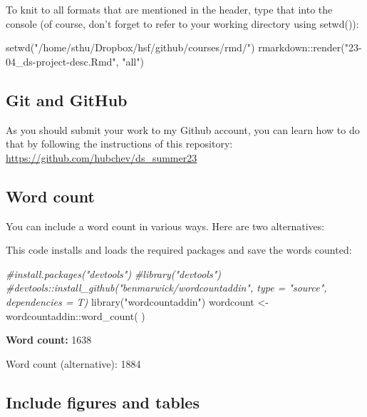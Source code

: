 \documentclass[
  12pt,
]{article}
\newenvironment{Shaded}{\begin{snugshade}}{\end{snugshade}}
\newcommand{\CommentTok}[1]{\textcolor[rgb]{0.56,0.35,0.01}{\textit{#1}}}
\newcommand{\FunctionTok}[1]{\textcolor[rgb]{0.00,0.00,0.00}{#1}}
\newcommand{\NormalTok}[1]{#1}
\newcommand{\OtherTok}[1]{\textcolor[rgb]{0.56,0.35,0.01}{#1}}
\newcommand{\SpecialCharTok}[1]{\textcolor[rgb]{0.00,0.00,0.00}{#1}}
\newcommand{\StringTok}[1]{\textcolor[rgb]{0.31,0.60,0.02}{#1}}
\begin{document}
To knit to all formats that are mentioned in the header, type that into the console (of course, don't forget to refer to your working directory using setwd()):

\begin{Shaded}
\begin{Highlighting}[]
\FunctionTok{setwd}\NormalTok{(}\StringTok{"/home/sthu/Dropbox/hsf/github/courses/rmd/"}\NormalTok{)}
\NormalTok{rmarkdown}\SpecialCharTok{::}\FunctionTok{render}\NormalTok{(}\StringTok{"23{-}04\_ds{-}project{-}desc.Rmd"}\NormalTok{, }\StringTok{"all"}\NormalTok{)}
\end{Highlighting}
\end{Shaded}

\hypertarget{git-and-github}{%
\subsection{Git and GitHub}\label{git-and-github}}

As you should submit your work to my Github account, you can learn how to do that by following the instructions of this repository: \url{https://github.com/hubchev/ds_summer23}

\hypertarget{word-count}{%
\subsection{Word count}\label{word-count}}

You can include a word count in various ways. Here are two alternatives:

This code installs and loads the required packages and save the words counted:

\begin{Shaded}
\begin{Highlighting}[]
\CommentTok{\#install.packages("devtools")}
\CommentTok{\#library("devtools")}
\CommentTok{\#devtools::install\_github("benmarwick/wordcountaddin", type = "source", dependencies = T)}
\FunctionTok{library}\NormalTok{(}\StringTok{"wordcountaddin"}\NormalTok{)}
\NormalTok{wordcount }\OtherTok{\textless{}{-}}\NormalTok{ wordcountaddin}\SpecialCharTok{::}\FunctionTok{word\_count}\NormalTok{( )}
\end{Highlighting}
\end{Shaded}

\textbf{Word count:} 1638

Word count (alternative): 1884

\hypertarget{include-figures-and-tables}{%
\subsection{Include figures and tables}\label{include-figures-and-tables}}
\end{document}
